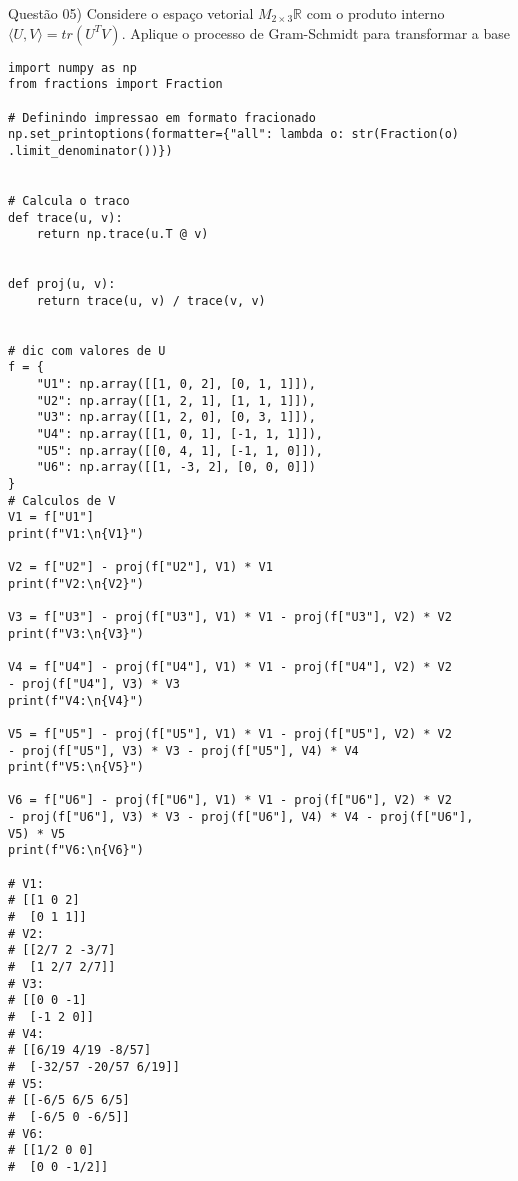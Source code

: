 
\noindent \textcolor{COLOR1}{Questão 05)} Considere o espaço vetorial $M_{2\times3}\mathbb{R}$ com o produto interno $\langle U, V\rangle= tr(U^TV)$.
Aplique o processo de Gram-Schmidt para transformar a base
\\

\begin{lstlisting}
import numpy as np
from fractions import Fraction
    
# Definindo impressao em formato fracionado
np.set_printoptions(formatter={"all": lambda o: str(Fraction(o)
.limit_denominator())})
    
    
# Calcula o traco
def trace(u, v):
    return np.trace(u.T @ v)
    
    
def proj(u, v):
    return trace(u, v) / trace(v, v)
    
    
# dic com valores de U
f = {
    "U1": np.array([[1, 0, 2], [0, 1, 1]]),
    "U2": np.array([[1, 2, 1], [1, 1, 1]]),
    "U3": np.array([[1, 2, 0], [0, 3, 1]]),
    "U4": np.array([[1, 0, 1], [-1, 1, 1]]),
    "U5": np.array([[0, 4, 1], [-1, 1, 0]]),
    "U6": np.array([[1, -3, 2], [0, 0, 0]])
}
# Calculos de V
V1 = f["U1"]
print(f"V1:\n{V1}")
    
V2 = f["U2"] - proj(f["U2"], V1) * V1
print(f"V2:\n{V2}")
    
V3 = f["U3"] - proj(f["U3"], V1) * V1 - proj(f["U3"], V2) * V2
print(f"V3:\n{V3}")
    
V4 = f["U4"] - proj(f["U4"], V1) * V1 - proj(f["U4"], V2) * V2 
- proj(f["U4"], V3) * V3
print(f"V4:\n{V4}")
    
V5 = f["U5"] - proj(f["U5"], V1) * V1 - proj(f["U5"], V2) * V2 
- proj(f["U5"], V3) * V3 - proj(f["U5"], V4) * V4
print(f"V5:\n{V5}")
    
V6 = f["U6"] - proj(f["U6"], V1) * V1 - proj(f["U6"], V2) * V2 
- proj(f["U6"], V3) * V3 - proj(f["U6"], V4) * V4 - proj(f["U6"], 
V5) * V5
print(f"V6:\n{V6}")
    
# V1:
# [[1 0 2]
#  [0 1 1]]
# V2:
# [[2/7 2 -3/7]
#  [1 2/7 2/7]]
# V3:
# [[0 0 -1]
#  [-1 2 0]]
# V4:
# [[6/19 4/19 -8/57]
#  [-32/57 -20/57 6/19]]
# V5:
# [[-6/5 6/5 6/5]
#  [-6/5 0 -6/5]]
# V6:
# [[1/2 0 0]
#  [0 0 -1/2]]
\end{lstlisting}